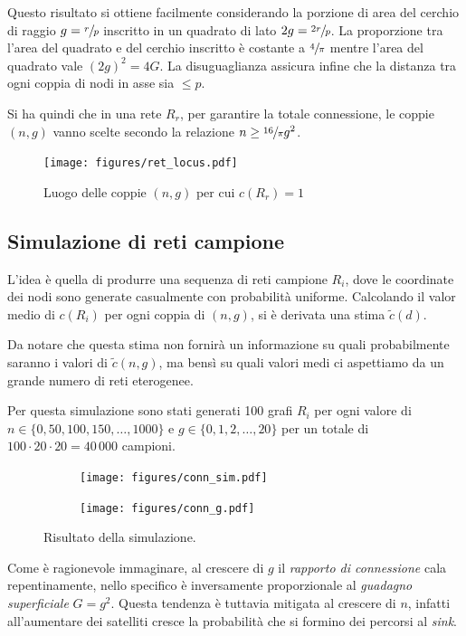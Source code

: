 \documentclass[a4paper,12pt]{article}
\theoremstyle{definition}
\begin{document}
Questo risultato si ottiene facilmente considerando la porzione di area del cerchio di raggio $g = \sfrac{r}{p}$ inscritto in un quadrato di lato $2g = \sfrac{2r}{p}$. La proporzione tra l'area del quadrato e del cerchio inscritto è costante a $\sfrac{4}{\pi}$ mentre l'area del quadrato vale $(2g)^2 = 4G$. La disuguaglianza assicura infine che la distanza tra ogni coppia di nodi in asse sia $\leq p$.

Si ha quindi che in una rete $R_r$, per garantire la totale connessione, le coppie $(n, g)$ vanno scelte secondo la relazione $n \geq \sfrac{16}{\pi} g^2$.

\begin{figure}[H]
\centering
\texttt{[image: figures/ret\_locus.pdf]}
\caption{Luogo delle coppie $(n, g)$ per cui $c(R_r) = 1$}
\end{figure}

\subsection{Simulazione di reti campione}

L'idea è quella di produrre una sequenza di reti campione $R_i$, dove le coordinate dei nodi sono generate casualmente con probabilità uniforme. Calcolando il valor medio di $c(R_i)$ per ogni coppia di $(n, g)$, si è derivata una stima $\tilde{c}(d)$.

Da notare che questa stima non fornirà un informazione su quali probabilmente saranno i valori di $\tilde{c}(n, g)$, ma bensì su quali valori medi ci aspettiamo da un grande numero di reti eterogenee.

Per questa simulazione sono stati generati 100 grafi $R_i$ per ogni valore di $n \in \{0, 50, 100, 150, \dots, 1000\}$ e $g \in \{0, 1, 2, \dots, 20\}$ per un totale di $100 \cdot 20 \cdot 20 = 40\,000$ campioni.

\begin{figure}[H]
\begin{subfigure}[b]{0.5\textwidth}
\texttt{[image: figures/conn\_sim.pdf]}
\caption{}
\end{subfigure}
\begin{subfigure}[b]{0.5\textwidth}
\texttt{[image: figures/conn\_g.pdf]}
\caption{}
\end{subfigure}
\caption{Risultato della simulazione.}%
\end{figure}

Come è ragionevole immaginare, al crescere di $g$ il \emph{rapporto di connessione} cala repentinamente, nello specifico è inversamente proporzionale al \emph{guadagno superficiale} $G = g^2$. Questa tendenza è tuttavia mitigata al crescere di $n$, infatti all'aumentare dei satelliti cresce la probabilità che si formino dei percorsi al \emph{sink}.
\end{document}
